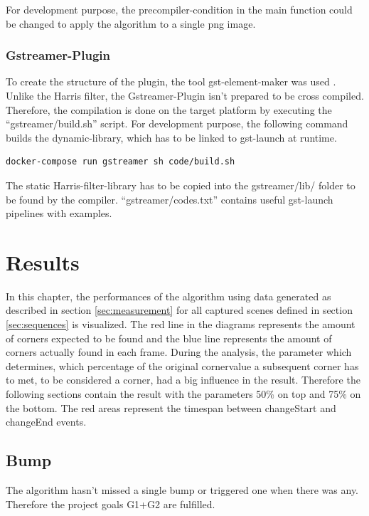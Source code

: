 For development purpose, the precompiler-condition in the main function could be changed to apply the algorithm to a single png image. 

\subsection{Gstreamer-Plugin}
To create the structure of the plugin, the tool gst-element-maker was used \cite{element-maker}. Unlike the Harris filter, the Gstreamer-Plugin isn't prepared to be cross compiled. Therefore, the compilation is done on the target platform by executing the \enquote{gstreamer/build.sh} script. For development purpose, the following command builds the dynamic-library, which has to be linked to gst-launch at runtime.

\begin{lstlisting}[language=bash]
docker-compose run gstreamer sh code/build.sh
\end{lstlisting}

The static Harris-filter-library has to be copied into the gstreamer/lib/ folder to be found by the compiler. \enquote{gstreamer/codes.txt} contains useful gst-launch pipelines with examples.

\chapter{Results}
In this chapter, the performances of the algorithm using data generated as described in section \ref{sec:measurement} for all captured  scenes defined in section \ref{sec:sequences} is visualized. The red line in the diagrams represents the amount of corners expected to be found and the blue line represents the amount of corners actually found in each frame. During the analysis, the parameter which determines, which percentage of the original cornervalue a subsequent corner has to met, to be considered a corner, had a big influence in the result. Therefore the following sections contain the result with the parameters 50\% on top and 75\% on the bottom. The red areas represent the timespan between changeStart and changeEnd events.

\section{Bump}
The algorithm hasn't missed a single bump or triggered one when there was any. Therefore the project goals G1+G2 are fulfilled.

